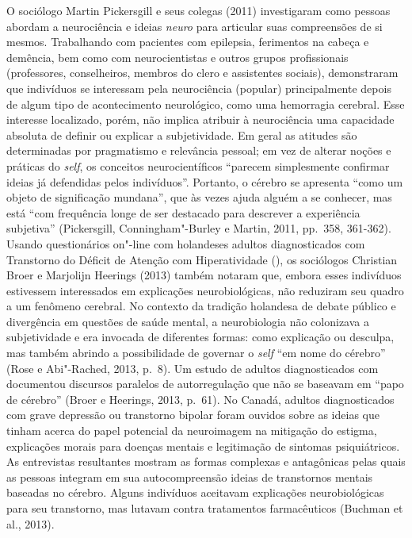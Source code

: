O sociólogo Martin Pickersgill e seus colegas (2011) investigaram como
pessoas abordam a neurociência e ideias \emph{neuro} para articular suas
compreensões de si mesmos. Trabalhando com pacientes com
epilepsia, ferimentos na cabeça e demência, bem como com neurocientistas
e outros grupos profissionais (professores, conselheiros, membros do
clero e assistentes sociais), demonstraram que indivíduos se interessam
pela neurociência (popular) principalmente depois de algum tipo de
acontecimento neurológico, como uma hemorragia cerebral. Esse interesse
localizado, porém, não implica atribuir à neurociência uma capacidade
absoluta de definir ou explicar a subjetividade. Em geral as atitudes
são determinadas por pragmatismo e relevância pessoal; em vez de alterar
noções e práticas do \emph{self}, os conceitos neurocientíficos ``parecem
simplesmente confirmar ideias já defendidas pelos indivíduos''.
Portanto, o cérebro se apresenta ``como um objeto de significação
mundana'', que às vezes ajuda alguém a se conhecer, mas está ``com
frequência longe de ser destacado para descrever a experiência
subjetiva'' (Pickersgill, Conningham"-Burley e Martin, 2011, pp.~358,
361-362). Usando questionários on"-line com holandeses adultos
diagnosticados com Transtorno do Déficit de Atenção com Hiperatividade
(), os sociólogos Christian Broer e Marjolijn Heerings (2013) também
notaram que, embora esses indivíduos estivessem interessados em
explicações neurobiológicas, não reduziram seu quadro a um fenômeno
cerebral. No contexto da tradição holandesa de debate público e
divergência em questões de saúde mental, a neurobiologia não colonizava
a subjetividade e era invocada de diferentes formas: como explicação ou
desculpa, mas também abrindo a possibilidade de governar o \emph{self} ``em
nome do cérebro'' (Rose e Abi"-Rached, 2013, p.~8). Um estudo de adultos
diagnosticados com  documentou discursos paralelos de autorregulação
que não se baseavam em ``papo de cérebro'' (Broer e Heerings, 2013,
p.~61). No Canadá, adultos diagnosticados com grave depressão ou
transtorno bipolar foram ouvidos sobre as ideias que tinham acerca do
papel potencial da neuroimagem na mitigação do estigma, explicações
morais para doenças mentais e legitimação de sintomas psiquiátricos. As
entrevistas resultantes mostram as formas complexas e antagônicas pelas
quais as pessoas integram em sua autocompreensão ideias de transtornos
mentais baseadas no cérebro. Alguns indivíduos aceitavam explicações
neurobiológicas para seu transtorno, mas lutavam contra tratamentos
farmacêuticos (Buchman et al., 2013).

